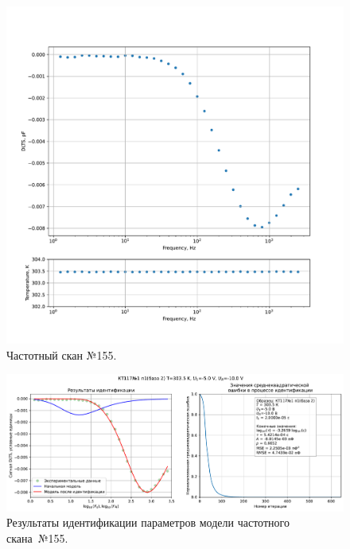 \begin{figure}[!ht]
    \centering
    \includegraphics[width=1\textwidth]{../plots/КТ117№1_п1(база 2)_2500Гц-1Гц_1пФ_+30С_-5В-10В_100мВ_20мкс_шаг_0,1.pdf}
    \caption{Частотный скан №155.}
    \label{pic:frequency_scan_155}
\end{figure}

\begin{figure}[!ht]
    \centering
    \includegraphics[width=1\textwidth]{../plots/КТ117№1_п1(база 2)_2500Гц-1Гц_1пФ_+30С_-5В-10В_100мВ_20мкс_шаг_0,1_model.pdf}
    \caption{Результаты идентификации параметров модели частотного скана~№155.}
    \label{pic:frequency_scan_model155}
\end{figure}

\pagebreak



